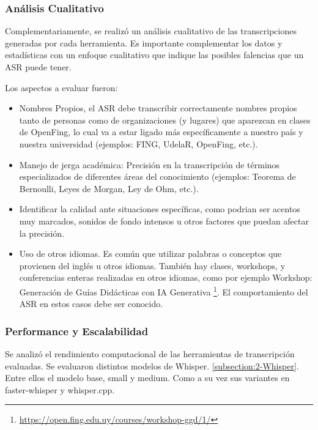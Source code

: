 \subsubsection{Análisis Cualitativo}
\label{subsubsection:3-Análisis Cualitativo}

Complementariamente, se realizó un análisis cualitativo de las transcripciones generadas por cada herramienta. Es importante complementar los datos y estadísticas con un enfoque cualitativo que indique las posibles falencias que un ASR puede tener.

Los aspectos a evaluar fueron:
\begin{itemize}
    \item Nombres Propios, el ASR debe transcribir correctamente nombres propios tanto de personas como de organizaciones (y lugares) que aparezcan en clases de OpenFing, lo cual va a estar ligado más específicamente a nuestro país y nuestra universidad (ejemplos: FING, UdelaR, OpenFing, etc.).
    \item Manejo de jerga académica: Precisión en la transcripción de términos especializados de diferentes áreas del conocimiento (ejemplos: Teorema de Bernoulli, Leyes de Morgan, Ley de Ohm, etc.).
    \item Identificar la calidad ante situaciones específicas, como podrian ser acentos muy marcados, sonidos de fondo intensos u otros factores que puedan afectar la precisión.
    \item Uso de otros idiomas. Es común que utilizar palabras o conceptos que provienen del inglés u otros idiomas. También hay clases, workshops, y conferencias enteras realizadas en otros idiomas, como por ejemplo Workshop: Generación de Guías Didácticas con IA Generativa \footnote{\url{https://open.fing.edu.uy/courses/workshop-ggd/1/}}. El comportamiento del ASR en estos casos debe ser conocido.

\end{itemize}

\subsubsection{Performance y Escalabilidad}
\label{subsection:3-Evaluación de Performance y Escalabilidad}

Se analizó el rendimiento computacional de las herramientas de transcripción evaluadas. Se evaluaron distintos modelos de Whisper. \autoref{subsection:2-Whisper}. Entre ellos el modelo base, small y medium. Como a su vez sus variantes en faster-whisper y whisper.cpp.

